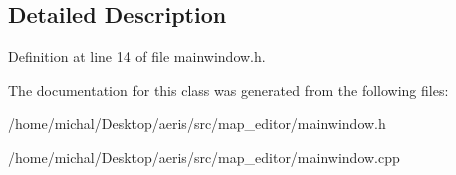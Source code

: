 \subsection{Detailed Description}


Definition at line 14 of file mainwindow.\-h.



The documentation for this class was generated from the following files\-:\begin{DoxyCompactItemize}
\item 
/home/michal/\-Desktop/aeris/src/map\-\_\-editor/mainwindow.\-h\item 
/home/michal/\-Desktop/aeris/src/map\-\_\-editor/mainwindow.\-cpp\end{DoxyCompactItemize}
